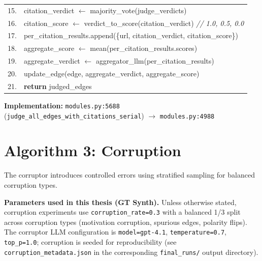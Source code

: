 \begin{table}[H]
\begin{tabular}{@{}r l@{}}
15. & \quad\quad citation\_verdict $\leftarrow$ majority\_vote(judge\_verdicts) \\
16. & \quad\quad citation\_score $\leftarrow$ verdict\_to\_score(citation\_verdict) \hfill\textit{// 1.0, 0.5, 0.0} \\
17. & \quad\quad per\_citation\_results.append(\{url, citation\_verdict, citation\_score\}) \\
18. & \quad aggregate\_score $\leftarrow$ mean(per\_citation\_results.scores) \\
19. & \quad aggregate\_verdict $\leftarrow$ aggregator\_llm(per\_citation\_results) \\
20. & \quad update\_edge(edge, aggregate\_verdict, aggregate\_score) \\
21. & \textbf{return} judged\_edges \\
\bottomrule
\end{tabular}
\end{table}

\textbf{Implementation:} \texttt{modules.py:5688} (\texttt{judge\_all\_edges\_with\_citations\_serial}) $\rightarrow$ \texttt{modules.py:4988}

\section{Algorithm 3: Corruption}
\label{alg:corruption}

The corruptor introduces controlled errors using stratified sampling for balanced corruption types.

\noindent\textbf{Parameters used in this thesis (GT Synth).} Unless otherwise stated, corruption experiments use \texttt{corruption\_rate=0.3} with a balanced 1/3 split across corruption types (motivation corruption, spurious edges, polarity flips). The corruptor LLM configuration is \texttt{model=gpt-4.1}, \texttt{temperature=0.7}, \texttt{top\_p=1.0}; corruption is seeded for reproducibility (see \texttt{corruption\_metadata.json} in the corresponding \texttt{final\_runs/} output directory).

